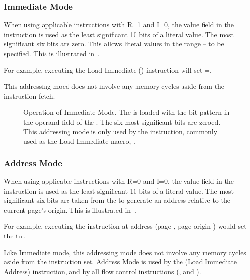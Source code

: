 \subsubsection{Immediate Mode}
\label{sec:immediate-mode}

When using applicable instructions with R=1 and I=0, the value field
in the instruction is used as the least significant 10 bits of a
literal value. The most significant six bits are zero. This allows
literal values in the range – to be
specified. This is illustrated in~.

For example, executing the Load Immediate () instruction  will set \A=.

This addressing moed does not involve any memory cycles aside from the
instruction fetch.



\begin{figure}[htb]
 \centering
     
\caption[Immediate Mode]{\label{fig:immediate-mode} Operation of Immediate
  Mode. The \AC{} is loaded with the bit pattern in the operand field of the
  \IR. The six most significant bits are zeroed. This addressing mode is only
  used by the  instruction, commonly used as the Load Immediate
  macro, .}
\end{figure}





\subsubsection{Address Mode}
\label{sec:address-mode}

When using applicable instructions with R=0 and I=0, the value field in the
instruction is used as the least significant 10 bits of a literal value. The
most significant six bits are taken from the \PC to generate an address
relative to the current page's origin. This is illustrated
in~.

For example, executing the instruction  at address  (page
, page origin ) would set the \PC{} to .

Like Immediate mode, this addressing mode does not involve any memory cycles
aside from the instruction set. Address Mode is used by the  (Load
Immediate Address) instruction, and by all flow control instructions
(,  and ).


